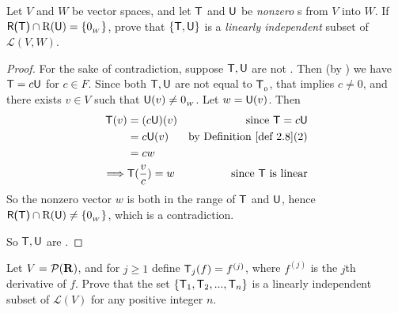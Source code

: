 \begin{exercise} \label{exercise 2.2.14}
Let \(V\) and \(W\) be vector spaces, and let \(\textsf{T}\) and \(\textsf{U}\) be \emph{nonzero} \LTRAN{}s from \(V\) into \(W\).
If \(\textsf{R(T)} \cap \mathrm{R}(\textsf{U}) = \{ 0_{_W} \}\), prove that
\(\{ \textsf{T}, \textsf{U} \}\) is a \emph{linearly independent} subset of \(\mathcal{L}(V, W)\).
\end{exercise}

\begin{proof}
For the sake of contradiction, suppose \(\textsf{T}, \textsf{U}\) are not \LID{}.
Then (by ) we have \(\textsf{T} = c\textsf{U}\) for \(c \in F\).
Since both \(\textsf{T}, \textsf{U}\) are not equal to \(\textsf{T}_{_0}\), that implies \(c \ne 0\), and there exists \(v \in V\) such that \(\textsf{U}(v) \ne 0_{_W}\).
Let \(w = \textsf{U}(v)\).
Then
\begin{align*}
    \T(v) & = (c\U)(v) & \text{since \(\T = c\U\)} \\
          & = c\U(v) & \text{by \DEF{2.8}(2)} \\
          & = cw \\
    \implies & \T(\frac{v}{c}) = w & \text{since \(\T\) is linear}
\end{align*}
So the nonzero vector \(w\) is both in the range of \(\textsf{T}\) and \(\textsf{U}\), hence \(\textsf{R(T)} \cap \mathrm{R}(\textsf{U}) \ne \{ 0_{_W} \}\), which is a contradiction.

So \(\textsf{T}, \textsf{U}\) are \LID{}.
\end{proof}

\begin{exercise} \label{exercise 2.2.15}
Let \(V = \mathcal{P}(\mathbf{R})\), and for \(j \ge 1\) define \(\textsf{T}_j(f) = f^{(j)}\), where \(f^{(j)}\) is the \(j\)th derivative of \(f\).
Prove that the set \(\{ \textsf{T}_1, \textsf{T}_2, ..., \textsf{T}_n \}\) is a
linearly independent subset of \(\mathcal{L}(V)\) for any positive integer \(n\).
\end{exercise}

